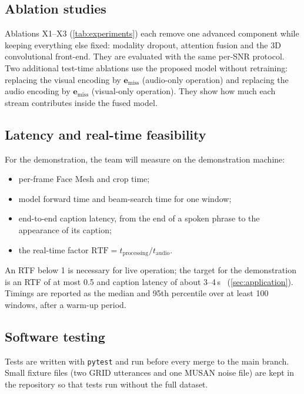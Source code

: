 \subsection{Ablation studies}
Ablations X1--X3 (\cref{tab:experiments}) each remove one advanced component
while keeping everything else fixed: modality dropout, attention fusion and the
3D convolutional front-end. They are evaluated with the same per-SNR protocol.
Two additional test-time ablations use the proposed model without retraining:
replacing the visual encoding by $\mathbf{e}_{\text{miss}}$ (audio-only operation)
and replacing the audio encoding by $\mathbf{e}_{\text{miss}}$ (visual-only
operation). They show how much each stream contributes inside the fused model.

\subsection{Latency and real-time feasibility}
For the demonstration, the team will measure on the demonstration machine:
\begin{itemize}
  \item per-frame Face Mesh and crop time;
  \item model forward time and beam-search time for one window;
  \item end-to-end caption latency, from the end of a spoken phrase to the
        appearance of its caption;
  \item the real-time factor $\mathrm{RTF} = t_{\text{processing}} / t_{\text{audio}}$.
\end{itemize}
An RTF below 1 is necessary for live operation; the target for the
demonstration is an RTF of at most 0.5 and caption latency of about 3--4\,s
\rec\ (\cref{sec:application}). Timings are reported as the median and 95th
percentile over at least 100 windows, after a warm-up period.

\subsection{Software testing}
\label{sec:testing}
Tests are written with \texttt{pytest} and run before every merge to the main
branch. Small fixture files (two GRID utterances and one MUSAN noise file) are kept
in the repository so that tests run without the full dataset.

